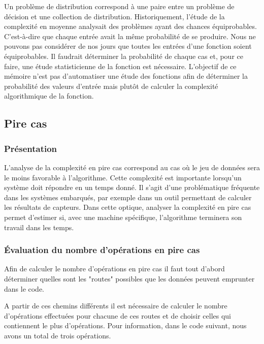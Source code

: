 \documentclass[12pt, twoside, openright]{report}
\begin{document}
Un problème de distribution correspond à une paire entre un problème de décision et une collection de distribution. Historiquement, l'étude de la complexité en moyenne analysait des problèmes ayant des chances équiprobables.\cite{avgComplexity02} C'est-à-dire que chaque entrée avait la même probabilité de se produire. Nous ne pouvons pas considérer de nos jours que toutes les entrées d'une fonction soient équiprobables. Il faudrait déterminer la probabilité de chaque cas et, pour ce faire, une étude statisticienne de la fonction est nécessaire. L'objectif de ce mémoire n'est pas d'automatiser une étude des fonctions afin de déterminer la probabilité des valeurs d'entrée mais plutôt de calculer la complexité algorithmique de la fonction.

\subsection{Pire cas}

\subsubsection{Présentation}

L'analyse de la complexité en pire cas correspond au cas où le jeu de données sera le moins favorable à l'algorithme. Cette complexité est importante lorsqu'un système doit répondre en un temps donné. Il s'agit d'une problématique fréquente dans les systèmes embarqués, par exemple dans un outil permettant de calculer les résultats de capteurs. Dans cette optique, analyser la complexité en pire cas permet d'estimer si, avec une machine spécifique, l'algorithme terminera son travail dans les temps. 

\subsubsection{Évaluation du nombre d'opérations en pire cas}

Afin de calculer le nombre d'opérations en pire cas il faut tout d'abord déterminer quelles sont les "routes" possibles que les données peuvent emprunter dans le code.

A partir de ces chemins différents il est nécessaire de calculer le nombre d'opérations effectuées pour chacune de ces routes et de choisir celles qui contiennent le plus d'opérations. Pour information, dans le code suivant, nous avons un total de trois opérations.


\end{document}
